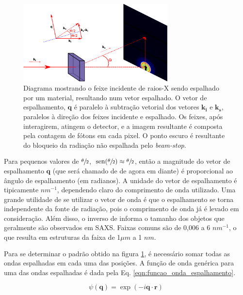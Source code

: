 		\begin{figure}[h]
			\centering
			\includegraphics[width=0.7\textwidth]{imagens/saxs/Esquema_SAXS}
			\caption{Diagrama mostrando o feixe incidente de raios-X sendo espalhado por um material, resultando num vetor espalhado. O vetor de espalhamento, \(\mathbf{q}\) é paralelo à subtração vetorial dos vetores \( \mathbf{k_i} \) e \( \mathbf{k_s} \), paralelos à direção dos feixes incidente e espalhado. Os feixes, após interagirem, atingem o detector, e a imagem resultante é composta pela contagem de fótons em cada pixel. O ponto escuro é resultante do bloqueio da radiação não espalhada pelo \emph{beam-stop}.}
			\label{fig:esquema_saxs}
		\end{figure}
		
		Para pequenos valores de \(\sfrac{\theta}{2}\), \(\hspace{2pt}\mathrm{sen}(\sfrac{\theta}{2}) \approx \sfrac{\theta}{2}\), então a magnitude do vetor de espalhamento \(\mathbf{q}\) (que será chamado de \q{} de agora em diante) é proporcional ao ângulo de espalhamento (em radianos). A unidade do vetor de espalhamento é tipicamente \(nm^{-1}\), dependendo claro do comprimento de onda utilizado. Uma grande utilidade de se utilizar o vetor de onda é que o espalhamento se torna independente da fonte de radiação, pois o comprimento de onda já é levado em consideração. Além disso, o inverso de \q{} informa o tamanho dos objetos que geralmente são observados em SAXS. Faixas comuns são de 0,006 a 6 \(nm^{-1}\), o que resulta em estruturas da faixa de 1\(\mu m\) a 1 \(nm\).

		Para se determinar o padrão obtido na figura \ref{fig:esquema_saxs}, é necessário somar todas as ondas espalhadas em cada uma das posições. A função de onda genérica para uma das ondas espalhadas é dada pela Eq. \ref{eqn:funcao_onda_espalhamento}.%
		
		\begin{equation}
			\psi(\mathbf{q}) = \exp(-i \mathbf{q} \cdot \mathbf{r})
			\label{eqn:funcao_onda_espalhamento}
		\end{equation}
		
